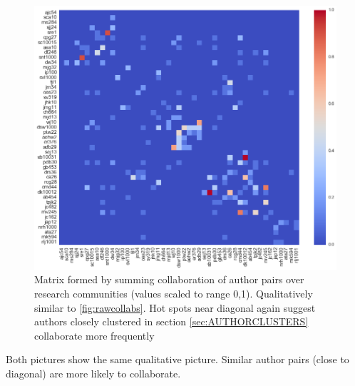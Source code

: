  \begin{figure}
    \label{fig:collcollabs}
    \includegraphics[width=\textwidth]{Analysis/comm_collabs.png}
    \caption{Matrix formed by summing collaboration of author pairs over research communities (values scaled to range 0,1). Qualitatively similar to \ref{fig:rawcollabs}. Hot spots near diagonal again suggest authors closely clustered in section \ref{sec:AUTHORCLUSTERS} collaborate more frequently }
\end{figure}

Both pictures show the same qualitative picture. Similar author pairs (close to diagonal) are more likely to collaborate. 

